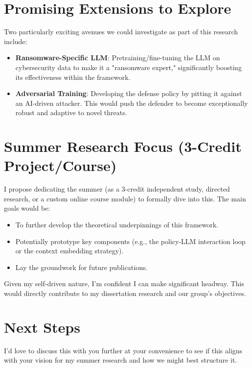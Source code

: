 \documentclass[11pt]{article}
\begin{document}
\section*{Promising Extensions to Explore}

Two particularly exciting avenues we could investigate as part of this research include:

\begin{itemize}
    \item \textbf{Ransomware-Specific LLM}: Pretraining/fine-tuning the LLM on cybersecurity data to make it a "ransomware expert," significantly boosting its effectiveness within the framework.
    \item \textbf{Adversarial Training}: Developing the defense policy by pitting it against an AI-driven attacker. This would push the defender to become exceptionally robust and adaptive to novel threats.
\end{itemize}

\section*{Summer Research Focus (3-Credit Project/Course)}

I propose dedicating the summer (as a 3-credit independent study, directed research, or a custom online course module) to formally dive into this. The main goals would be:
\begin{itemize}
    \item To further develop the theoretical underpinnings of this framework.
    \item Potentially prototype key components (e.g., the policy-LLM interaction loop or the context embedding strategy).
    \item Lay the groundwork for future publications.
\end{itemize}
Given my self-driven nature, I'm confident I can make significant headway. This would directly contribute to my dissertation research and our group's objectives.

\section*{Next Steps}

I'd love to discuss this with you further at your convenience to see if this aligns with your vision for my summer research and how we might best structure it.
\end{document}
